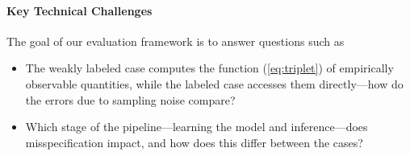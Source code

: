 \paragraph{Key Technical Challenges}
The goal of our evaluation framework is to answer questions such as
\begin{itemize}
  \setlength\itemsep{0em}
    \item The weakly labeled case computes the function (\ref{eq:triplet}) of empirically observable quantities, while the labeled case accesses them directly---how do the errors due to sampling noise compare? 
    \item Which stage of the pipeline---learning the model and inference---does misspecification impact, and how does this differ between the cases?
\end{itemize}








